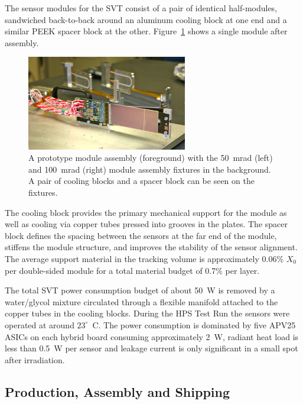 \documentclass[final,3p,times,twocolumn]{elsarticle}
\begin{document}
The sensor modules for the SVT consist of a pair of identical half-modules, sandwiched back-to-back 
around an aluminum cooling block at one end and a similar PEEK spacer block at the other. 
Figure~\ref{fig:tracker_module} shows a single module after assembly.
\begin{figure}[htp]
	\begin{center}
   	 \includegraphics[width=7cm]{figures/IMG_5200}
	\caption{\small{A prototype module assembly (foreground) with the 50~mrad (left) and 100~mrad (right) module assembly fixtures in the background.  A pair of cooling blocks and a spacer block can be seen on the fixtures.} }
	\label{fig:tracker_module}
	\end{center}
\vspace*{-5mm}
\end{figure}
The cooling block provides the primary mechanical support for the module as well as cooling via copper 
tubes pressed into grooves in the plates. The spacer block defines the spacing between the sensors at 
the far end of the module, stiffens the module structure, and improves the stability of the sensor 
alignment.  The average support material in the tracking volume is approximately 0.06\% $X_{0}$ per 
double-sided module for a total material budget of 0.7\% per layer.

The total SVT power consumption budget of about 50~W is removed by a water/glycol mixture 
circulated through a flexible manifold attached to the copper tubes in the cooling blocks. During the 
HPS Test Run the sensors were operated at around $23^{\circ}$~C. The power consumption is 
dominated by five 
APV25 ASICs on each hybrid board consuming approximately 2~W, radiant heat load is less than 
0.5~W per sensor and leakage current is only significant in a small spot after irradiation.  







\subsection{Production, Assembly and Shipping}
\end{document}
